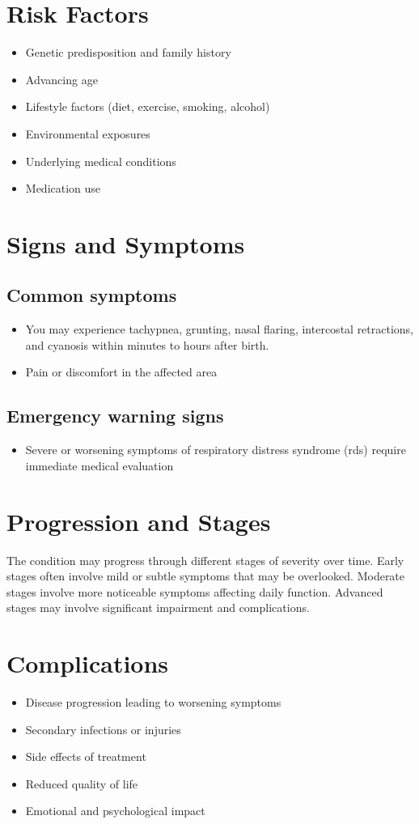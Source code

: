 \section{Risk Factors}
\begin{itemize}[noitemsep]
  \item Genetic predisposition and family history
  \item Advancing age
  \item Lifestyle factors (diet, exercise, smoking, alcohol)
  \item Environmental exposures
  \item Underlying medical conditions
  \item Medication use
\end{itemize}
\section{Signs and Symptoms}

\subsection{Common symptoms}
\begin{itemize}[noitemsep]
  \item You may experience tachypnea, grunting, nasal flaring, intercostal retractions, and cyanosis within minutes to hours after birth.
  \item Pain or discomfort in the affected area
  \end{itemize}

\subsection{Emergency warning signs}
\begin{itemize}[noitemsep]
  \item Severe or worsening symptoms of respiratory distress syndrome (rds) require immediate medical evaluation
\end{itemize}
\section{Progression and Stages}
The condition may progress through different stages of severity over time. Early stages often involve mild or subtle symptoms that may be overlooked. Moderate stages involve more noticeable symptoms affecting daily function. Advanced stages may involve significant impairment and complications.
\section{Complications}
\begin{itemize}[noitemsep]
  \item Disease progression leading to worsening symptoms
  \item Secondary infections or injuries
  \item Side effects of treatment
  \item Reduced quality of life
  \item Emotional and psychological impact
\end{itemize}
